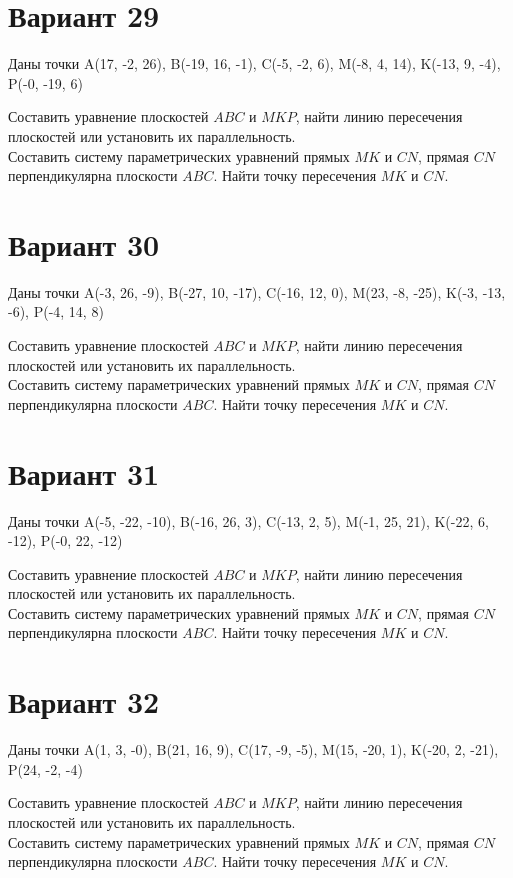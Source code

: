 \documentclass[11pt]{article}
\begin{document}
\section*{Вариант 29}
Даны точки A(17, -2, 26), B(-19, 16, -1), C(-5, -2, 6), M(-8, 4, 14), K(-13, 9, -4), P(-0, -19, 6)

Составить уравнение плоскостей $ABC$ и $MKP$, найти линию пересечения плоскостей или установить их параллельность.\\
Составить систему параметрических уравнений прямых $MK$ и $CN$, прямая $CN$ перпендикулярна плоскости $ABC$. Найти точку пересечения $MK$ и $CN$.

\section*{Вариант 30}
Даны точки A(-3, 26, -9), B(-27, 10, -17), C(-16, 12, 0), M(23, -8, -25), K(-3, -13, -6), P(-4, 14, 8)

Составить уравнение плоскостей $ABC$ и $MKP$, найти линию пересечения плоскостей или установить их параллельность.\\
Составить систему параметрических уравнений прямых $MK$ и $CN$, прямая $CN$ перпендикулярна плоскости $ABC$. Найти точку пересечения $MK$ и $CN$.

\section*{Вариант 31}
Даны точки A(-5, -22, -10), B(-16, 26, 3), C(-13, 2, 5), M(-1, 25, 21), K(-22, 6, -12), P(-0, 22, -12)

Составить уравнение плоскостей $ABC$ и $MKP$, найти линию пересечения плоскостей или установить их параллельность.\\
Составить систему параметрических уравнений прямых $MK$ и $CN$, прямая $CN$ перпендикулярна плоскости $ABC$. Найти точку пересечения $MK$ и $CN$.

\section*{Вариант 32}
Даны точки A(1, 3, -0), B(21, 16, 9), C(17, -9, -5), M(15, -20, 1), K(-20, 2, -21), P(24, -2, -4)

Составить уравнение плоскостей $ABC$ и $MKP$, найти линию пересечения плоскостей или установить их параллельность.\\
Составить систему параметрических уравнений прямых $MK$ и $CN$, прямая $CN$ перпендикулярна плоскости $ABC$. Найти точку пересечения $MK$ и $CN$.
\end{document}
